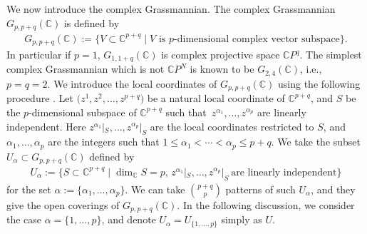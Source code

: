\documentclass[10pt,a4paper]{amsart}
\numberwithin{equation}{section}
\begin{document}
We now introduce the complex Grassmannian. The complex Grassmannian $G_{p,p+q}(\mathbb{C})$ is defined by
\begin{align*}
 G_{p,p+q}(\mathbb{C})
 :=
\bigl\{ V \subset \mathbb{C}^{p+q} \mid V \mbox{ is $p$-dimensional complex vector subspace}
\bigr\}.
\end{align*}
In particular if $p=1$, $G_{1,1+q}(\mathbb{C})$ is complex projective space $\mathbb{C}P^{q}$. The simplest complex Grassmannian which is not $\mathbb{C}P^{N}$ is known to be $G_{2,4}(\mathbb{C})$, i.e., $p=q=2$.
We introduce the local coordinates of $G_{p,p+q}(\mathbb{C})$ using the following procedure \cite{KN}. Let $\bigl(z^{1}, z^{2} ,\dots ,z^{p+q}\bigr)$ be a natural local coordinate of $\mathbb{C}^{p+q}$, and $S$ be the $p$-dimensional subspace of $\mathbb{C}^{p+q}$ such that~${z^{\alpha_{1}},\dots, z^{\alpha_{p}}}$ are linearly independent. Here $z^{\alpha_{1}}|_{S},\dots, z^{\alpha_{p}}|_{S}$ are the local coordinates restricted to $S$, and~${\alpha_{1},\dots, \alpha_{p}}$ are the integers such that $1\leq\alpha_{1}<\cdots<\alpha_{p}\leq p+q$. We take the subset $U_{\alpha}\subset G_{p,p+q}(\mathbb{C})$ defined by
\begin{align*}
U_{\alpha}
:=
\{
S
\subset
\mathbb{C}^{p+q}
\mid
\dim\nolimits_{\mathbb{C}}S
=
p,\,
z^{\alpha_{1}}|_{S},\dots, z^{\alpha_{p}}|_{S}
\ \text{are linearly independent}
\}
\end{align*}
for the set $\alpha:=\{\alpha_{1},\dots, \alpha_{p}\}$. We can take $\binom{p+q}{p}$ patterns of such $U_{\alpha}$, and they give the open coverings of $G_{p,p+q}(\mathbb{C})$. In the following discussion, we consider the case $\alpha=\{1,\dots,p\}$, and denote $U_{\alpha}=U_{\{1,\dots,p\}}$ simply as $U$.
\end{document}
